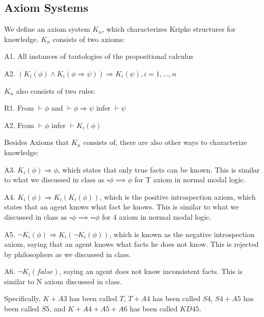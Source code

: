 \documentclass{article}
\begin{document}
\subsection{Axiom Systems}
\par We define an axiom system $K_n$, which characterizes Kripke structures for knowledge. $K_n$ consists of two axioms: \\
\par A1. All instances of tautologies of the propositional calculus
\par A2. $(K_i(\phi)\land K_i(\phi\Rightarrow\psi))\Rightarrow K_i(\psi),i=1,...,n$ \\
\par $K_n$ also consists of two rules: \\
\par R1. From $\vdash\phi$ and $\vdash\phi\Rightarrow\psi$ infer $\vdash\psi$
\par A2. From $\vdash\phi$ infer $\vdash K_i(\phi)$ \\
\par Besides Axioms that $K_n$ consists of, there are also other ways to characterize knowledge: \\
\par A3. $K_i(\phi) \Rightarrow \phi$, which states that only true facts can be known. This is similar to what we discussed in class as $\square\phi \implies \phi$ for T axiom in normal modal logic.
\par A4. $K_i(\phi) \Rightarrow K_i(K_i(\phi))$, which is the positive introspection axiom, which states that an agent knows what fact he knows. This is similar to what we discussed in class as $\square\phi \implies \square\square\phi$ for 4 axiom in normal modal logic.
\par A5. $\lnot K_i(\phi) \Rightarrow K_i(\lnot K_i(\phi))$, which is known as the negative introspection axiom, saying that an agent knows what facts he does not know. This is rejected by philosophers as we discussed in class.
\par A6. $\lnot K_i(false)$, saying an agent does not know inconsistent facts. This is similar to N axiom discussed in class.\\
\par Specifically, $K+A3$ has been called $T$, $T+A4$ has been called $S4$, $S4+A5$ has been called $S5$, and $K+A4+A5+A6$ has been called $KD45$.
\end{document}
